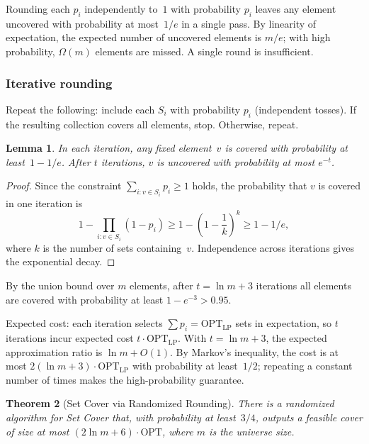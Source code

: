 \documentclass[twoside,12pt]{book}
\theoremstyle{plain}
\newtheorem{theorem}{Theorem}[chapter]
\newtheorem{lemma}[theorem]{Lemma}
\theoremstyle{definition}
\theoremstyle{remark}
\begin{document}
Rounding each $p_i$ independently to~$1$ with probability $p_i$
leaves any element uncovered with probability at most~$1/e$ in a
single pass.  By linearity of expectation, the expected number of
uncovered elements is $m/e$; with high probability,
$\Omega(m)$ elements are missed.  A single round is insufficient.

\subsubsection*{Iterative rounding}

Repeat the following: include each $S_i$ with probability
$p_i$ (independent tosses).  If the resulting collection covers
all elements, stop.  Otherwise, repeat.

\begin{lemma}
\label{lemma:setcover-iter}
In each iteration, any fixed element~$v$ is covered with probability
at least~$1 - 1/e$.  After $t$ iterations, $v$ is uncovered with
probability at most $e^{-t}$.
\end{lemma}

\begin{proof}
Since the constraint $\sum_{i: v \in S_i} p_i \ge 1$ holds, the
probability that $v$ is covered in one iteration is
\[
1 - \prod_{i: v \in S_i} (1 - p_i)
\ge 1 - \left(1 - \frac{1}{k}\right)^k
\ge 1 - 1/e,
\]
where $k$ is the number of sets containing~$v$.  Independence
across iterations gives the exponential decay.
\end{proof}

By the union bound over $m$ elements, after $t = \ln m + 3$
iterations all elements are covered with probability at least
$1 - e^{-3} > 0.95$.

Expected cost: each iteration selects $\sum p_i = \text{OPT}_{\text{LP}}$
sets in expectation, so $t$ iterations incur expected cost
$t \cdot \text{OPT}_{\text{LP}}$.  With $t = \ln m + 3$, the expected
approximation ratio is $\ln m + O(1)$.  By Markov's inequality, the
cost is at most $2(\ln m + 3) \cdot \text{OPT}_{\text{LP}}$ with
probability at least~$1/2$; repeating a constant number of times
makes the high-probability guarantee.

\begin{theorem}[Set Cover via Randomized Rounding]
\label{thm:setcover-rounding}
There is a randomized algorithm for Set Cover that, with probability
at least~$3/4$, outputs a feasible cover of size at most
$(2\ln m + 6) \cdot \text{OPT}$, where $m$ is the universe size.
\end{theorem}
\end{document}
